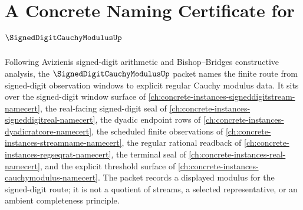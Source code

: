 \chapter{A Concrete Naming Certificate for $\SignedDigitCauchyModulusUp$}
\label{ch:concrete-instances-signed-digit-cauchy-modulus-namecert}

Following Avizienis signed-digit arithmetic and Bishop--Bridges constructive analysis, the $\SignedDigitCauchyModulusUp$ packet names the finite route from signed-digit observation windows to explicit regular Cauchy modulus data. It sits over the signed-digit window surface of \autoref{ch:concrete-instances-signeddigitstream-namecert}, the real-facing signed-digit seal of \autoref{ch:concrete-instances-signeddigitreal-namecert}, the dyadic endpoint rows of \autoref{ch:concrete-instances-dyadicratcore-namecert}, the scheduled finite observations of \autoref{ch:concrete-instances-streamname-namecert}, the regular rational readback of \autoref{ch:concrete-instances-regseqrat-namecert}, the terminal seal of \autoref{ch:concrete-instances-real-namecert}, and the explicit threshold surface of \autoref{ch:concrete-instances-cauchymodulus-namecert}. The packet records a displayed modulus for the signed-digit route; it is not a quotient of streams, a selected representative, or an ambient completeness principle.

